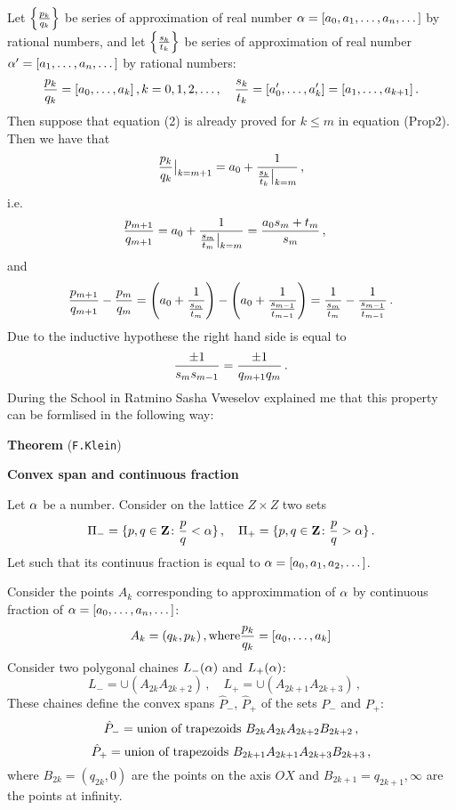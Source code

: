 Let  $\left\{{p_k\over q_k}\right\}$ be 
series of approximation of real number 
$\alpha=[a_0,a_1,\dots,a_n,\dots]$
by rational numbers, and 
let  $\left\{{s_k\over t_k}\right\}$ be 
series of approximation of real number 
$\alpha'=[a_1,\dots,a_n,\dots]$
by rational numbers:
         $$
{p_k\over q_k}=[a_0,\dots,a_{k}]\,,k=0,1,2,\dots, \quad
{s_k\over t_k}=[a'_0,\dots,a'_{k}]=[a_1,\dots,a_{k+1}]\,.
         $$ 
Then suppose that equation (2) is already proved for
   $k\leq m$ in equation (Prop2). Then we have  that
      $$
{p_k\over q_k}\big\vert_{k=m+1}=
        a_0+
     {
    1\over
           {s_k\over t_k}\big\vert_{k=m}
        }\,,
      $$
i.e.   $$
{p_{m+1}\over q_{m+1}}=
        a_0+
     {
    1\over
           {s_m\over t_m}\big\vert_{k=m}
        }={a_0s_m+t_m\over s_m}\,,\quad
      $$
and
  $$
 {p_{m+1}\over q_{m+1}}-
 {p_{m}\over q_{m}}=
  \left(    
      a_0+
     {
    1\over
           {s_m\over t_m}
        }
        \right)
         -
          \left(    
      a_0+
     {
    1\over
           {s_{m-1}\over t_{m-1}}
        }
        \right)=
     {
    1\over
           {s_m\over t_m}
        }
         -
     {
    1\over
           {s_{m-1}\over t_{m-1}}
        }\,.
        $$
Due to the inductive hypothese
the right hand side is equal to
          $$
{\pm 1\over s_ms_{m-1}}={\pm 1\over q_{m+1}q_m}\,.
        $$
During the School in Ratmino Sasha Vweselov explained
me that this property can be formlised in the following way:


{\bf Theorem} ({\tt F.Klein})

\centerline {\bf Convex span and continuous fraction}

Let  $\alpha$  be a number.
         Consider on the lattice $Z\times Z$ two sets
       $$
\Pi_-=\{p,q\in {\bf Z}\colon {p\over q}<\alpha\}\,,\quad
\Pi_+=\{p,q\in {\bf Z}\colon {p\over q}>\alpha\}\,.
       $$
Let 
such that its continuus fraction is equal to
  $\alpha=[a_0,a_1,a_2,\dots]$.

  Consider the points  $A_k$ corresponding
to approximmation of $\alpha$ by continuous fraction
of $\alpha=[a_0,\dots,a_n,\dots]$:
     $$
     A_k=(q_k,p_k)\,, {\rm where}
    {p_k\over q_k}=[a_0,\dots,a_k]
     $$
Consider two polygonal chaines  $L_-(\alpha)$ and $L_+(\alpha)$:
       $$
  L_-=\cup \left(A_{2k}  A_{2k+2}\right)\,,\quad
  L_+=\cup \left(A_{2k+1}  A_{2k+3}\right)\,,\quad
       $$
These chaines define the convex spans   
${\hat P}_-$, 
${\hat P}_+$ 
of the sets
  $P_-$ and $P_+$:
       $$
{\hat P}_-=\hbox {union of trapezoids 
$B_{2k}A_{2k}A_{2k+2}B_{2k+2}$}\,,
         $$
       $$
{\hat P}_+=\hbox {union of trapezoids 
$B_{2k+1}A_{2k+1}A_{2k+3}B_{2k+3}$}\,,
         $$
where $B_{2k}=(q_{2k},0)$ are the points on the axis
$OX$ and $B_{2k+1}={q_{2k+1},\infty}$ are the points 
at infinity.

\bye
